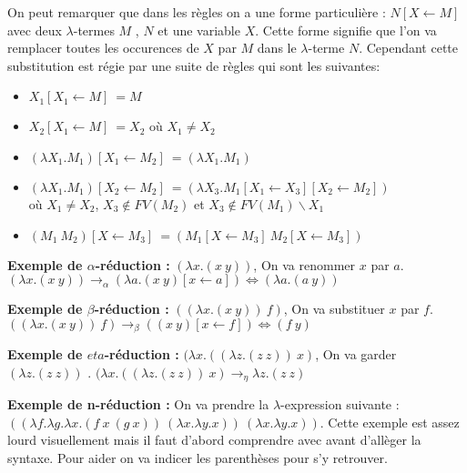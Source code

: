 \documentclass[10pt,a4paper]{article}
\begin{document}
				
				On peut remarquer que dans les règles on a une forme particulière : $N [X \leftarrow M]$ avec deux $\lambda$-termes $M$ , $N$ et une variable $X$. Cette forme signifie que l'on va remplacer toutes les occurences de $X$ par $M$ dans le $\lambda$-terme $N$. Cependant cette substitution est régie par une suite de règles qui sont les suivantes: 
				\begin{itemize}
					\item $X_{1}[X_{1} \leftarrow M]~= M$
					\item $X_{2}[X_{1} \leftarrow M]~= X_{2}$ où $X_{1}\neq X_{2}$
					\item $(\lambda X_{1}.M_{1})[X_{1} \leftarrow M_{2}]~= (\lambda X_{1}.M_{1})$
					\item $(\lambda X_{1}.M_{1})[X_{2} \leftarrow M_{2}]~= (\lambda X_{3}.M_{1}[X_{1} \leftarrow X_{3}][X_{2} \leftarrow M_{2}])$ 
					\\où $X_{1} \neq X_{2}$, $X_{3} \notin FV(M_{2})$ et $X_{3} \notin FV(M_{1})\backslash{X_{1}}$ 
					\item $(M_{1}~M_{2})[X \leftarrow M_{3}]~=(M_{1}[X \leftarrow M_{3}]~M_{2}[X \leftarrow M_{3}])$
				\end{itemize}
				\bigbreak
				
				\textbf{Exemple de $\alpha$-réduction :} $(\lambda x.(x~y)) $, On va renommer $x$ par $a$. $(\lambda x.(x~y)) \rightarrow_{\alpha} (\lambda a.(x~y)[x \leftarrow a]) \Longleftrightarrow (\lambda a.(a~y))$ 
				\medbreak
				
				\textbf{Exemple de $\beta$-réduction :} $((\lambda x.(x~y))~f)$, On va substituer $x$ par $f$. $((\lambda x.(x~y))~f) \rightarrow_{\beta} ((x~y)[x \leftarrow f]) \Longleftrightarrow (f~y)$ 
				\medbreak
				
				\textbf{Exemple de $eta$-réduction :} $(\lambda x.((\lambda z.(z~z))~x)$, On va garder $(\lambda z.(z~z))$ . $(\lambda x.((\lambda z.(z~z))~x) \rightarrow_{\eta} \lambda z.(z~z)$ 
				\medbreak
				
				\textbf{Exemple de \textbf{n}-réduction :} On va prendre la $\lambda$-expression suivante : $((\lambda f.\lambda g.\lambda x.(f~x~(g~x))~(\lambda x.\lambda y.x))~(\lambda x.\lambda y.x))$. Cette exemple est assez lourd visuellement mais il faut d'abord comprendre avec avant d'allèger la syntaxe. Pour aider on va indicer les parenthèses pour s'y retrouver. 
				\smallbreak
				
\end{document}
